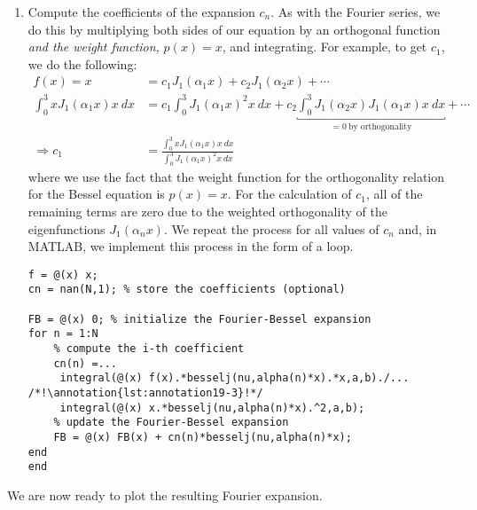 \begin{enumerate}
\item Compute the coefficients of the expansion $c_n$.  As with the Fourier series, we do this by multiplying both sides of our equation by an orthogonal function \emph{and the weight function, } $p(x)=x$, and integrating. For example, to get $c_1$, we do the following:
\begin{align*}
f(x) = x &= c_1 J_1\left(\alpha_1 x\right) + c_2 J_1 \left(\alpha_2 x\right) + \cdots \\
\int_0^3 x J_1\left(\alpha_1 x\right) x \ dx &= c_1 \int_0^3 J_1\left(\alpha_1 x\right)^2 x \ dx + c_2 \underbracket{\int_0^3 J_1\left(\alpha_2 x \right) J_1 \left( \alpha_1 x \right) x \ dx}_{=0 \ \text{by orthogonality}} + \cdots \\
\Rightarrow c_1 &= \frac{\int_0^3 x J_1\left(\alpha_1 x\right) x \ dx}{\int_0^3 J_1\left(\alpha_1 x\right)^2 x \ dx}
\end{align*}
where we use the fact that the weight function for the orthogonality relation for the Bessel equation is $p(x)=x$.  For the calculation of $c_1$, all of the remaining terms are zero due to the weighted orthogonality of the eigenfunctions $J_1\left(\alpha_n x \right)$.  We repeat the process for all values of $c_n$ and, in MATLAB, we implement this process in the form of a loop.
\begin{lstlisting}[name=lec19_ex,style=myMatlab]
f = @(x) x; 
cn = nan(N,1); % store the coefficients (optional)

FB = @(x) 0; % initialize the Fourier-Bessel expansion
for n = 1:N
    % compute the i-th coefficient
    cn(n) =...
     integral(@(x) f(x).*besselj(nu,alpha(n)*x).*x,a,b)./... /*!\annotation{lst:annotation19-3}!*/
     integral(@(x) x.*besselj(nu,alpha(n)*x).^2,a,b);
    % update the Fourier-Bessel expansion
    FB = @(x) FB(x) + cn(n)*besselj(nu,alpha(n)*x); 
end
end
\end{lstlisting}
\end{enumerate}
We are now ready to plot the resulting Fourier expansion.

